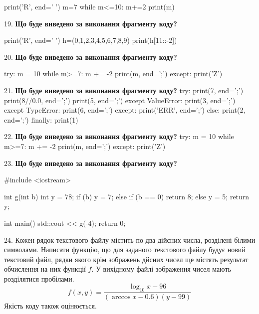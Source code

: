 \documentclass[11pt]{article}
\begin{document}
print('R', end=' ')
m=7
while m<=10:
    m+=2
print(m)

\par\vspace{5mm}
19. \textbf{Що буде виведено за виконання фрагменту коду?}

print('R', end=' ')
h=(0,1,2,3,4,5,6,7,8,9)
print(h[11::-2])

\par\vspace{5mm}
20. \textbf{Що буде виведено за виконання фрагменту коду?}

try:
    m = 10
    while m>=7:
        m += -2
    print(m, end=';')
except:
    print('Z')

\par\vspace{5mm}
21. \textbf{Що буде виведено за виконання фрагменту коду?}
try:
    print(7, end=';')
    print(8//0.0, end=';')
    print(5, end=';')
except ValueError:
    print(3, end=';')
except TypeError:
    print(6, end=';')
except:
    print('ERR', end=';')
else:
    print(2, end=';')
finally:
    print(1)
\par\vspace{5mm}
22. \textbf{Що буде виведено за виконання фрагменту коду?}
try:
    m = 10
    while m>=7:
        m += -2
    print(m, end=';')
except:
    print('Z')
\par\vspace{5mm}
23. \textbf{Що буде виведено за виконання фрагменту коду?}

#include <iostream>

int g(int b){
    int y = 78;
    if (b) 
        y = 7;
    else if (b == 0)
         return 8;
    else
         y = 5;
    return y;
}

int main(){
    std::cout << g(-4);
    return 0;
}

\par\vspace{5mm}
24. 
Кожен рядок текстового файлу містить по два дійсних числа, розділені білими символами.
Написати функцію, що для заданого текстового файлу будує новий текстовий файл, рядки якого крім зображень дйсних чисел ще містять результат обчислення на них функції $f$. У вихідному файлі зображення чисел мають розділятися пробілами. 
$$f(x, y) =\frac{\log_{10} x - 96}{(\arccos x - 0.6) (y - 99)}$$ 
Якість коду також оцінюється.
\end{document}
